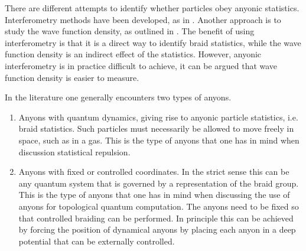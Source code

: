 There are different attempts to identify whether particles obey anyonic statistics. Interferometry methods have been developed, as in \cite{bonderson}. Another approach is to study the wave function density, as outlined in \cite{lundholm-rougerie,fractional angular momentum}. The benefit of using interferometry is that it is a direct way to identify braid statistics, while the wave function density is an indirect effect of the statistics. However, anyonic interferometry is in practice difficult to achieve, it can be argued that wave function density is easier to measure.

In the literature one generally encounters two types of anyons.
\begin{enumerate}
  \item Anyons with quantum dynamics, giving rise to anyonic particle statistics, i.e. braid statistics. Such particles must necessarily be allowed to move freely in space, such as in a gas. This is the type of anyons that one has in mind when discussion statistical repulsion.
  \item Anyons with fixed or controlled coordinates. In the strict sense this can be any quantum system that is governed by a representation of the braid group. This is the type of anyons that one has in mind when discussing the use of anyons for topological quantum computation. The anyons need to be fixed so that controlled braiding can be performed. In principle this can be achieved by forcing the position of dynamical anyons by placing each anyon in a deep potential that can be externally controlled.
\end{enumerate}
